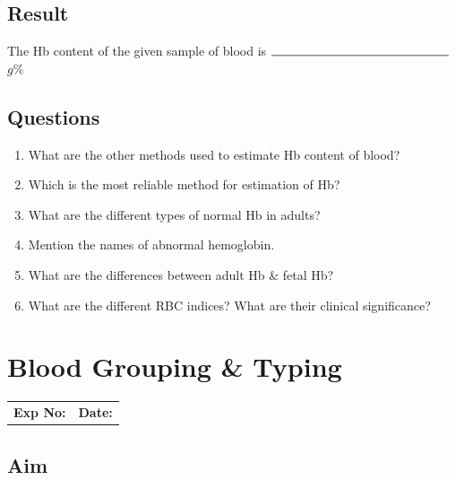 \documentclass[a4paper,12pt,openany,oneside]{book}
\begin{document}
								\section*{Result}
								The Hb content of the given sample of blood is $\rule{5cm}{0.5pt}$ $g$\%
								\section*{Questions}
								\begin{enumerate}
									\item{What are the other methods used to estimate Hb content of blood?}
									\item{Which is the most reliable method for estimation of Hb?}
									\item{What are the different types of normal Hb in adults?}
									\item{Mention the names of abnormal hemoglobin.}
									\item{What are the differences between adult Hb \& fetal Hb?}
									\item{What are the different RBC indices? What are their clinical significance?}
								\end{enumerate}

								\chapter*{\centering Blood Grouping \& Typing}
								\begin{tabular}{p{5in} p{1in}}
									\textbf{Exp No:}  & \textbf{Date:}\\
								\end{tabular}

								\section*{Aim}
\end{document}
